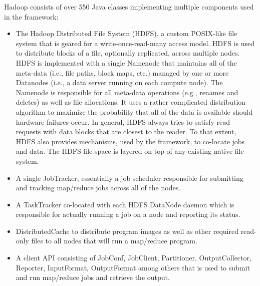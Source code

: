 \documentclass[DM,lsstdraft,toc]{lsstdoc}
\begin{document}
Hadoop consists of over 550 Java classes implementing multiple
components used in the framework:

\begin{itemize}
\item
  The Hadoop Distributed File System (HDFS), a custom POSIX-like file
  system that is geared for a write-once-read-many access model. HDFS is
  used to distribute blocks of a file, optionally replicated, across
  multiple nodes. HDFS is implemented with a single Namenode that
  maintains all of the meta-data (i.e., file paths, block maps, etc.)
  managed by one or more Datanodes (i.e., a data server running on each
  compute node). The Namenode is responsible for all meta-data
  operations (e.g., renames and deletes) as well as file allocations. It
  uses a rather complicated distribution algorithm to maximize the
  probability that all of the data is available should hardware failures
  occur. In general, HDFS always tries to satisfy read requests with
  data blocks that are closest to the reader. To that extent, HDFS also
  provides mechanisms, used by the framework, to co-locate jobs and
  data. The HDFS file space is layered on top of any existing native
  file system.
\item
  A single JobTracker, essentially a job scheduler responsible for
  submitting and tracking map/reduce jobs across all of the nodes.
\item
  A TaskTracker co-located with each HDFS DataNode daemon which is
  responsible for actually running a job on a node and reporting its
  status.
\item
  DistributedCache to distribute program images as well as other
  required read-only files to all nodes that will run a map/reduce
  program.
\item
  A client API consisting of JobConf, JobClient, Partitioner,
  OutputCollector, Reporter, InputFormat, OutputFormat among others that
  is used to submit and run map/reduce jobs and retrieve the output.
\end{itemize}
\end{document}
